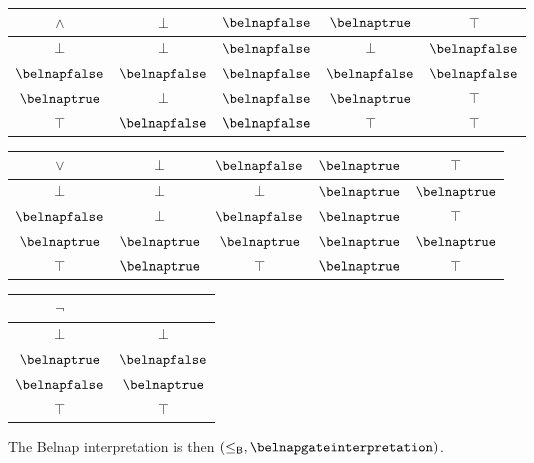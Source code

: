 \begin{example}
    \begin{center}
        \begin{tabular}{|c|cccc|}
            \hline
            \(\land\) & \(\bot\) & \(\belnapfalse\) & \(\belnaptrue\) & \(\top\) \\
            \hline
            \(\bot\)  & \(\bot\) & \(\belnapfalse\) & \(\bot\) & \(\belnapfalse\) \\
            \(\belnapfalse\) & \(\belnapfalse\) & \(\belnapfalse\) & \(\belnapfalse\) & \(\belnapfalse\) \\
            \(\belnaptrue\) & \(\bot\) & \(\belnapfalse\) & \(\belnaptrue\) & \(\top\) \\
            \(\top\) & \(\belnapfalse\) & \(\belnapfalse\) & \(\top\) & \(\top\) \\
            \hline
        \end{tabular}
        \quad
        \begin{tabular}{|c|cccc|}
            \hline
            \(\lor\) & \(\bot\) & \(\belnapfalse\) & \(\belnaptrue\) & \(\top\) \\
            \hline
            \(\bot\)  & \(\bot\) & \(\bot\) & \(\belnaptrue\) & \(\belnaptrue\) \\
            \(\belnapfalse\) & \(\bot\) & \(\belnapfalse\) & \(\belnaptrue\) & \(\top\) \\
            \(\belnaptrue\) & \(\belnaptrue\) & \(\belnaptrue\) & \(\belnaptrue\) & \(\belnaptrue\) \\
            \(\top\) & \(\belnaptrue\) & \(\top\) & \(\belnaptrue\) & \(\top\) \\
            \hline
        \end{tabular}
        \quad
        \begin{tabular}{|c|c|}
            \hline
            \(\neg\) & \\
            \hline
            \(\bot\) & \(\bot\) \\
            \(\belnaptrue\) & \(\belnapfalse\) \\
            \(\belnapfalse\) & \(\belnaptrue\) \\
            \(\top\) & \(\top\) \\
            \hline
        \end{tabular}
    \end{center}

    The Belnap interpretation is then \(
        (\leq_\mathsf{B}, \belnapgateinterpretation)
    \).
\end{example}
